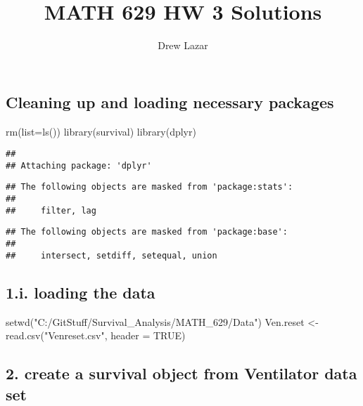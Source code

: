 \documentclass[
]{article}
\title{MATH 629 HW 3 Solutions}
\author{Drew Lazar}
\date{}
\newenvironment{Shaded}{\begin{snugshade}}{\end{snugshade}}
\newcommand{\AttributeTok}[1]{\textcolor[rgb]{0.77,0.63,0.00}{#1}}
\newcommand{\ConstantTok}[1]{\textcolor[rgb]{0.00,0.00,0.00}{#1}}
\newcommand{\FunctionTok}[1]{\textcolor[rgb]{0.00,0.00,0.00}{#1}}
\newcommand{\NormalTok}[1]{#1}
\newcommand{\OtherTok}[1]{\textcolor[rgb]{0.56,0.35,0.01}{#1}}
\newcommand{\StringTok}[1]{\textcolor[rgb]{0.31,0.60,0.02}{#1}}
\begin{document}
\maketitle

\hypertarget{cleaning-up-and-loading-necessary-packages}{%
\subsection{Cleaning up and loading necessary
packages}\label{cleaning-up-and-loading-necessary-packages}}

\begin{Shaded}
\begin{Highlighting}[]
\FunctionTok{rm}\NormalTok{(}\AttributeTok{list=}\FunctionTok{ls}\NormalTok{())}
\FunctionTok{library}\NormalTok{(survival)}
\FunctionTok{library}\NormalTok{(dplyr)}
\end{Highlighting}
\end{Shaded}

\begin{verbatim}
## 
## Attaching package: 'dplyr'
\end{verbatim}

\begin{verbatim}
## The following objects are masked from 'package:stats':
## 
##     filter, lag
\end{verbatim}

\begin{verbatim}
## The following objects are masked from 'package:base':
## 
##     intersect, setdiff, setequal, union
\end{verbatim}

\hypertarget{i.-loading-the-data}{%
\subsection{1.i. loading the data}\label{i.-loading-the-data}}

\begin{Shaded}
\begin{Highlighting}[]
\FunctionTok{setwd}\NormalTok{(}\StringTok{"C:/GitStuff/Survival\_Analysis/MATH\_629/Data"}\NormalTok{)}
\NormalTok{Ven.reset }\OtherTok{\textless{}{-}}\FunctionTok{read.csv}\NormalTok{(}\StringTok{"Venreset.csv"}\NormalTok{, }\AttributeTok{header =} \ConstantTok{TRUE}\NormalTok{)}
\end{Highlighting}
\end{Shaded}

\hypertarget{create-a-survival-object-from-ventilator-data-set}{%
\subsection{2. create a survival object from Ventilator data
set}\label{create-a-survival-object-from-ventilator-data-set}}
\end{document}

